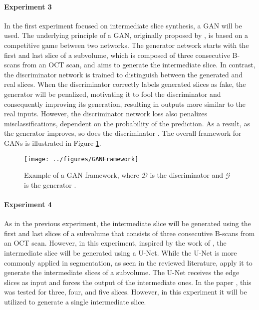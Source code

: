 \paragraph{Experiment 3}
In the first experiment focused on intermediate slice synthesis, a GAN will be used. The underlying principle of a GAN, originally proposed by \textcite{Goodfellow2014}, is based on a competitive game between two networks. The generator network starts with the first and last slice of a subvolume, which is composed of three consecutive B-scans from an OCT scan, and aims to generate the intermediate slice. In contrast, the discriminator network is trained to distinguish between the generated and real slices. When the discriminator correctly labels generated slices as fake, the generator will be penalized, motivating it to fool the discriminator and consequently improving its generation, resulting in outputs more similar to the real inputs. However, the discriminator network loss also penalizes misclassifications, dependent on the probability of the prediction. As a result, as the generator improves, so does the discriminator \parencite{Goodfellow2020}. The overall framework for GANs is illustrated in Figure \ref{fig:GANFramework}.

\begin{figure}[!ht]
	\centering
	\texttt{[image: ../figures/GANFramework]}
	\caption{Example of a GAN framework, where $\mathcal{D}$ is the discriminator and $\mathcal{G}$ is the generator \cite{Creswell2018}.}
	\label{fig:GANFramework}
\end{figure}

\paragraph{Experiment 4}
As in the previous experiment, the intermediate slice will be generated using the first and last slices of a subvolume that consists of three consecutive B-scans from an OCT scan. However, in this experiment, inspired by the work of \textcite{Nishimoto2024}, the intermediate slice will be generated using a U-Net. While the U-Net is more commonly applied in segmentation, as seen in the reviewed literature, \textcite{Nishimoto2024} apply it to generate the intermediate slices of a subvolume. The U-Net receives the edge slices as input and forces the output of the intermediate ones. In the paper \parencite{Nishimoto2024}, this was tested for three, four, and five slices. However, in this experiment it will be utilized to generate a single intermediate slice.

